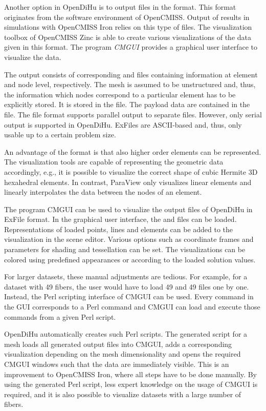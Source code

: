 Another option in OpenDiHu is to output files in the  format. This format originates from the software environment of OpenCMISS. Output of results in simulations with OpenCMISS Iron relies on this type of files. The visualization toolbox of OpenCMISS Zinc is able to create various visualizations of the data given in this format. The program \emph{CMGUI} provides a graphical user interface to visualize the data.

The output consists of corresponding  and  files containing information at element and node level, respectively. The mesh is assumed to be unstructured and, thus, the information which nodes correspond to a particular element has to be explicitly stored. It is stored in the  file. The payload data are contained in the  file. The file format supports parallel output to separate files. However, only serial output is supported in OpenDiHu.
ExFiles are ASCII-based and, thus, only usable up to a certain problem size.

An advantage of the  format is that also higher order elements can be represented. The visualization tools are capable of representing the geometric data accordingly, e.g., it is possible to visualize the correct shape of cubic Hermite 3D hexahedral elements. In contrast, ParaView only visualizes linear elements and linearly interpolates the data between the nodes of an element.

The program CMGUI can be used to visualize the output files of OpenDiHu in ExFile format.
In the graphical user interface, the  and  files can be loaded. Representations of loaded points, lines and elements can be added to the visualization in the scene editor. Various options such as coordinate frames and parameters for shading and tessellation can be set. The visualizations can be colored using predefined appearances or according to the loaded solution values.

For larger datasets, these manual adjustments are tedious. For example, for a dataset with 49 fibers, the user would have to load 49  and 49  files one by one. Instead, the Perl scripting interface of CMGUI can be used. Every command in the GUI corresponds to a Perl command and CMGUI can load and execute those commands from a given Perl script.

OpenDiHu automatically creates such Perl scripts. The generated script for a mesh loads all generated output files into CMGUI, adds a  corresponding visualization depending on the mesh dimensionality and opens the required CMGUI windows such that the data are immediately visible. This is an improvement to OpenCMISS Iron, where all steps have to be done manually. By using the generated Perl script, less expert knowledge on the usage of CMGUI is required, and it is also possible to visualize datasets with a large number of fibers.

